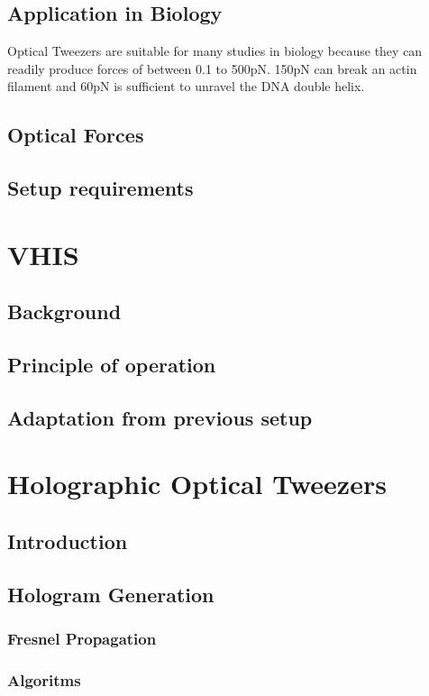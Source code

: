 \documentclass{kepfl}
\begin{document}
\section{Application in Biology}
Optical Tweezers are suitable for many studies in biology because they can readily produce forces of between 0.1 to 500pN.
150pN can break an actin filament and 60pN is sufficient to unravel the DNA double helix. 
\section{Optical Forces}
\section{Setup requirements}

\chapter{VHIS}
\section{Background}
\section{Principle of operation}
\section{Adaptation from previous setup}

\chapter{Holographic Optical Tweezers}
\section{Introduction}
\section{Hologram Generation}
\subsection{Fresnel Propagation}
\subsection{Algoritms}
\end{document}

